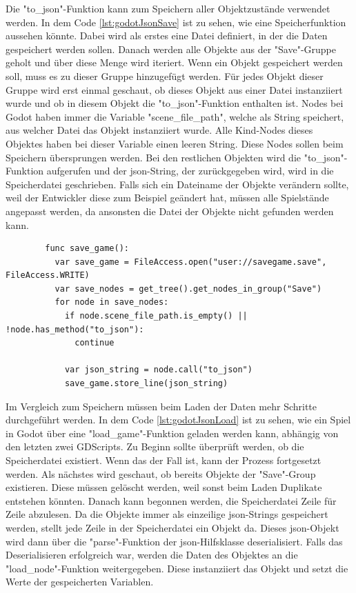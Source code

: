 Die "to\_json"-Funktion kann zum Speichern aller Objektzustände verwendet werden. In dem Code \ref{lst:godotJsonSave} ist zu sehen, wie eine Speicherfunktion aussehen könnte. Dabei wird als erstes eine Datei definiert, in der die Daten gespeichert werden sollen. Danach werden alle Objekte aus der "Save"-Gruppe geholt und über diese Menge wird iteriert. Wenn ein Objekt gespeichert werden soll, muss es zu dieser Gruppe hinzugefügt werden. Für jedes Objekt dieser Gruppe wird erst einmal geschaut, ob dieses Objekt aus einer Datei instanziiert wurde und ob in diesem Objekt die "to\_json"-Funktion enthalten ist. Nodes bei Godot haben immer die Variable "scene\_file\_path", welche als String speichert, aus welcher Datei das Objekt instanziiert wurde. Alle Kind-Nodes dieses Objektes haben bei dieser Variable einen leeren String.\cite{godotengineNode} Diese Nodes sollen beim Speichern übersprungen werden. Bei den restlichen Objekten wird die "to\_json"-Funktion aufgerufen und der \ac{json}-String, der zurückgegeben wird, wird in die Speicherdatei geschrieben.\cite{godotengineSavingGames} Falls sich ein Dateiname der Objekte verändern sollte, weil der Entwickler diese zum Beispiel geändert hat, müssen alle Spielstände angepasst werden, da ansonsten die Datei der Objekte nicht gefunden werden kann.

\begin{listing}[htp]
    \begin{verbatim}
        func save_game():
          var save_game = FileAccess.open("user://savegame.save", FileAccess.WRITE)
          var save_nodes = get_tree().get_nodes_in_group("Save")
          for node in save_nodes:
            if node.scene_file_path.is_empty() || !node.has_method("to_json"): 
              continue 

            var json_string = node.call("to_json")
            save_game.store_line(json_string)
    \end{verbatim}
    \caption{Speichern aller JSON-Daten der Knoten aus der "Save"-Gruppe \cite{godotengineSavingGames}}
    \label{lst:godotJsonSave}
\end{listing}

Im Vergleich zum Speichern müssen beim Laden der Daten mehr Schritte durchgeführt werden. In dem Code \ref{lst:godotJsonLoad} ist zu sehen, wie ein Spiel in Godot über eine "load\_game"-Funktion geladen werden kann, abhängig von den letzten zwei GDScripts. Zu Beginn sollte überprüft werden, ob die Speicherdatei existiert. Wenn das der Fall ist, kann der Prozess fortgesetzt werden. Als nächstes wird geschaut, ob bereits Objekte der "Save"-Group existieren. Diese müssen gelöscht werden, weil sonst beim Laden Duplikate entstehen könnten. Danach kann begonnen werden, die Speicherdatei Zeile für Zeile abzulesen. Da die Objekte immer als einzeilige \ac{json}-Strings gespeichert werden, stellt jede Zeile in der Speicherdatei ein Objekt da. Dieses \ac{json}-Objekt wird dann über die "parse"-Funktion der \ac{json}-Hilfsklasse deserialisiert. Falls das Deserialisieren erfolgreich war, werden die Daten des Objektes an die "load\_node"-Funktion weitergegeben. Diese instanziiert das Objekt und setzt die Werte der gespeicherten Variablen.\cite{godotengineSavingGames}

